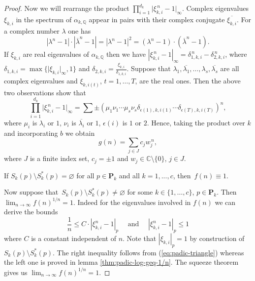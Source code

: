 \documentclass[12pt, a4paper]{amsart}
\def\a{\alpha}
\newcommand{\ov}[1]{\overline{#1}}
\begin{document}
\begin{proof}
 Now we will rearrange the product
  $\prod_{i=1}^{d_k} \lvert \xi_{k,i}^{\, n} - 1
  \rvert_\infty$.  Complex eigenvalues $\xi_{k,i}$ in the spectrum of
  $\a_{k,\mathbb{Q}}$  appear in pairs with their complex conjugate
  $\ov{\xi_{k,i}}$.  For a complex number $\lambda$ one has
$$
|\lambda^n-1| \cdot |\overline\lambda^n-1|=|\lambda^n-1| ^2=(\lambda^n-1)\cdot (\overline\lambda^n-1).
$$
If $\xi_{k,i}$  are real
  eigenvalues of $\a_{k,\mathbb{Q}}$   then
  we have
  $| \xi_{k,i}^{\, n} - 1 |_\infty= \delta_{1,k,i}^{\,
    n} - \delta_{2,k,i}^{\, n}$, where
  $\delta_{1,k,i} = \max\{\lvert \xi_{k,i} \rvert_\infty,1\} $ and
  $\delta_{2,k,i}=\frac{\xi_{k,i}}{\delta_{1,k,i}}$.
Suppose that $\lambda_1, \overline{\lambda_1},\dots,\lambda_s, \overline{\lambda_s}$ are all complex eigenvalues
and $\xi_{k,i(t)}$, $t=1,\dots,T$, are the real ones.
Then the above two observations show that
\begin{equation}\label{eq:form_of_w}
\prod_{i=1}^{d_k} \lvert \xi_{k,i}^{\, n} - 1
  \rvert_\infty=\sum \pm (\mu_1 \nu_1 \cdots \mu_s \nu_s  \delta_{\epsilon(1),k,i(1)} \cdots  \delta_{\epsilon(T),k,i(T)})^n,
\end{equation}
where $\mu_i$ is $\lambda_i$ or $1$, $\nu_i$ is $\overline{\lambda_i}$ or $1$, $\epsilon(i)$ is $1$ or $2$.
Hence, taking the product over $k$ and incorporating $b$ we obtain
  \begin{equation}\label{eq:gn_w}
    g(n) = \sum_{j \in J} c_jw_j^{\, n},
  \end{equation}
  where $J$ is a finite index set, $c_j =\pm 1$ and
  $ w_j \in \mathbb{C} \setminus \{0\}$, $j\in J$.

  If $S_k(p)\setminus S_k^*(p)=\varnothing$ for all $p\in \mathbf{P}_k $ and all $k=1, . . . , c$,
then~$f(n)\equiv 1$.

 Now suppose that~$S_k(p)\setminus S_k^*(p)\neq\varnothing$ for
some $k\in \{1, \dots, c\}$, $p\in \mathbf{P}_k $.
Then \linebreak $\lim_{n\rightarrow\infty}f(n)^{1/n}=1$.
Indeed for the eigenvalues involved in $f(n)$ we can derive the bounds
\begin{equation}\label{eq:fn_bounds}
  \frac{1}{n} \leq C \cdot | \xi_{k,i}^n - 1 |_p \quad \mbox{ and } \quad | \xi_{k,i}^n - 1 |_p \leq 1
\end{equation}
where $C$ is a constant independent of $n$.
Note that $|\xi_{k,i}|_p = 1$ by construction of $S_k(p)\setminus S_k^*(p)$.
The right inequality follows from (\ref{eq:padic-triangle}) whereas
the left one is proved in lemma \ref{thm:padic-log-geq-1/n}.
The squeeze theorem gives us $\lim_{n\rightarrow\infty}f(n)^{1/n}=1$.


\end{proof}
\end{document}
